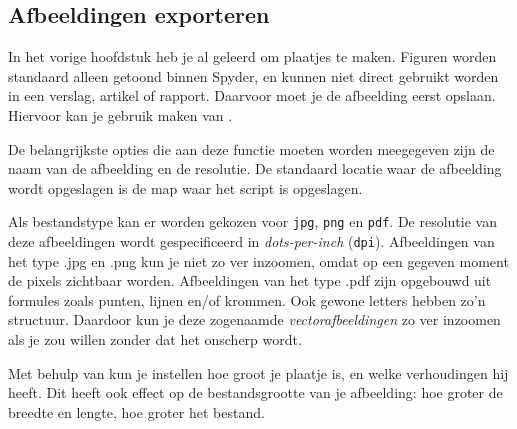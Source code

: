 \documentclass[a4paper,11pt, fleqn]{article}
\begin{document}
\subsection{Afbeeldingen exporteren}
In het vorige hoofdstuk heb je al geleerd om plaatjes te maken. Figuren worden standaard alleen getoond binnen Spyder, en kunnen niet direct gebruikt worden in een verslag, artikel of rapport. Daarvoor moet je de afbeelding eerst opslaan. Hiervoor kan je gebruik maken van .

De belangrijkste opties die aan deze functie moeten worden meegegeven zijn de naam van de afbeelding en de resolutie. De standaard locatie waar de afbeelding wordt opgeslagen is de map waar het script is opgeslagen. 

Als bestandstype kan er worden gekozen voor \verb.jpg., \verb.png. en  \verb.pdf.. 
De resolutie van deze afbeeldingen wordt gespecificeerd in \textit{dots-per-inch}  (\verb,dpi,).
Afbeeldingen van het type .jpg en .png kun je niet zo ver inzoomen, omdat op een gegeven moment de pixels zichtbaar worden. 
Afbeeldingen van het type .pdf zijn opgebouwd uit formules zoals punten, lijnen en/of krommen. Ook gewone letters hebben zo'n structuur. Daardoor kun je deze zogenaamde \textit{vectorafbeeldingen} zo ver inzoomen als je zou willen zonder dat het onscherp wordt.

Met behulp van  kun je instellen hoe groot je plaatje is, en welke verhoudingen hij heeft. Dit heeft ook effect op de bestandsgrootte van je afbeelding: hoe groter de breedte en lengte, hoe groter het bestand.

\end{document}
